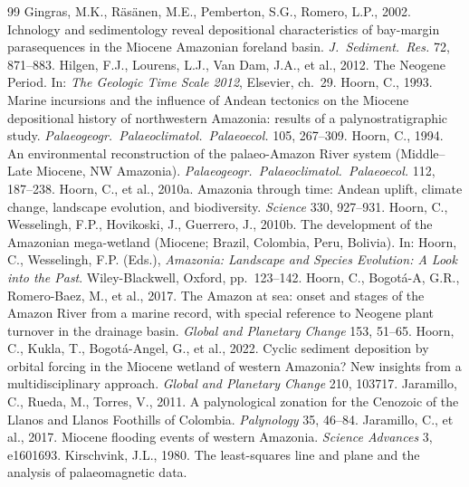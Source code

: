 \documentclass[11pt]{article}
\begin{document}
\begin{thebibliography}{99}
 Gingras, M.K., R\"as\"anen, M.E.,
Pemberton, S.G., Romero, L.P., 2002. Ichnology and sedimentology reveal
depositional characteristics of bay-margin parasequences in the Miocene Amazonian
foreland basin. \textit{J.\ Sediment.\ Res.} 72, 871--883.
 Hilgen, F.J., Lourens, L.J.,
Van Dam, J.A., et al., 2012. The Neogene Period. In: \textit{The Geologic Time
Scale 2012}, Elsevier, ch.~29.
 Hoorn, C., 1993. Marine incursions and the
influence of Andean tectonics on the Miocene depositional history of
northwestern Amazonia: results of a palynostratigraphic study. \textit{Palaeogeogr.\
Palaeoclimatol.\ Palaeoecol.} 105, 267--309.
 Hoorn, C., 1994. An environmental
reconstruction of the palaeo-Amazon River system (Middle--Late Miocene, NW
Amazonia). \textit{Palaeogeogr.\ Palaeoclimatol.\ Palaeoecol.} 112, 187--238.
\bibitem[Hoorn et al.(2010a)]{Hoorn2010} Hoorn, C., et al., 2010a. Amazonia
through time: Andean uplift, climate change, landscape evolution, and
biodiversity. \textit{Science} 330, 927--931.
 Hoorn, C., Wesselingh, F.P.,
Hovikoski, J., Guerrero, J., 2010b. The development of the Amazonian mega-wetland
(Miocene; Brazil, Colombia, Peru, Bolivia). In: Hoorn, C., Wesselingh, F.P.
(Eds.), \textit{Amazonia: Landscape and Species Evolution: A Look into the Past}.
Wiley-Blackwell, Oxford, pp.~123--142.
 Hoorn, C., Bogot\'a-A, G.R., Romero-Baez, M.,
et al., 2017. The Amazon at sea: onset and stages of the Amazon River from a
marine record, with special reference to Neogene plant turnover in the drainage
basin. \textit{Global and Planetary Change} 153, 51--65.
 Hoorn, C., Kukla, T., Bogot\'a-Angel, G.,
et al., 2022. Cyclic sediment deposition by orbital forcing in the Miocene wetland
of western Amazonia? New insights from a multidisciplinary approach. \textit{Global
and Planetary Change} 210, 103717.
 Jaramillo, C., Rueda, M.,
Torres, V., 2011. A palynological zonation for the Cenozoic of the Llanos and
Llanos Foothills of Colombia. \textit{Palynology} 35, 46--84.
 Jaramillo, C., et al., 2017.
Miocene flooding events of western Amazonia. \textit{Science Advances} 3,
e1601693.
 Kirschvink, J.L., 1980. The
least-squares line and plane and the analysis of palaeomagnetic data.

\end{thebibliography}
\end{document}
